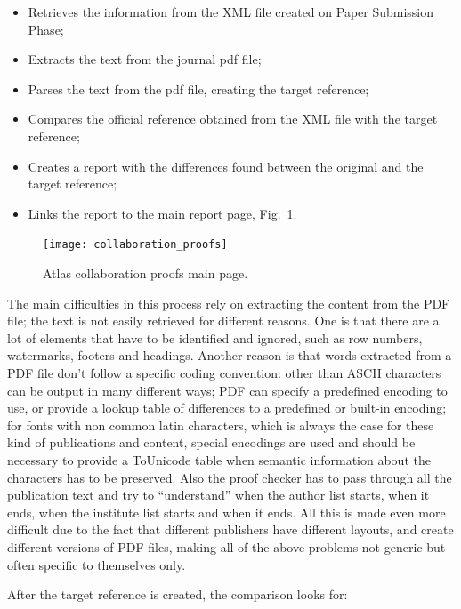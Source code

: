 \begin{itemize}
\item Retrieves the information from the XML file created on Paper Submission Phase;
\item Extracts the text from the journal pdf file;
\item Parses the text from the pdf file, creating the target reference;
\item Compares the official reference obtained from the XML file with the target reference;
\item Creates a report with the differences found between the original and the target reference;
\item Links the report to the main report page, Fig.~\ref{fig:collaboration_proofs}.
\end{itemize}

\begin{figure}[ht!]
  \centering
  \texttt{[image: collaboration\_proofs]}
  \caption{Atlas collaboration proofs main page.}
  \label{fig:collaboration_proofs}
\end{figure}

The main difficulties in this process rely on extracting the content from the PDF file; the text is not easily retrieved for different reasons. 
One is that there are a lot of elements that have to be identified and ignored, such as row numbers, watermarks, footers and headings. 
Another reason is that words extracted from a PDF file don’t follow a specific coding convention: other than ASCII characters can be output in many different ways; PDF can specify a predefined encoding to use, or provide a lookup table of differences to a predefined or built-in encoding; for fonts with non common latin characters, which is always the case for these kind of publications and content, special encodings are used and should be necessary to provide a ToUnicode table when semantic information about the characters has to be preserved. 
Also the proof checker has to pass through all the publication text and try to “understand” when the author list starts, when it ends, when the institute list starts and when it ends.
All this is made even more difficult due to the fact that different publishers have different layouts, and create different versions of PDF files, making all of the above problems not generic but often specific to themselves only.

After the target reference is created, the comparison looks for:


